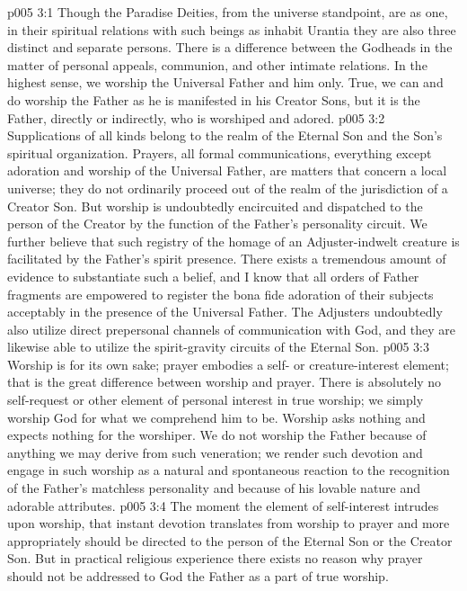 \vs p005 3:1 Though the Paradise Deities, from the universe standpoint, are as one, in their spiritual relations with such beings as inhabit Urantia they are also three distinct and separate persons. There is a difference between the Godheads in the matter of personal appeals, communion, and other intimate relations. In the highest sense, we worship the Universal Father and him only. True, we can and do worship the Father as he is manifested in his Creator Sons, but it is the Father, directly or indirectly, who is worshiped and adored.
\vs p005 3:2 Supplications of all kinds belong to the realm of the Eternal Son and the Son’s spiritual organization. Prayers, all formal communications, everything except adoration and worship of the Universal Father, are matters that concern a local universe; they do not ordinarily proceed out of the realm of the jurisdiction of a Creator Son. But worship is undoubtedly encircuited and dispatched to the person of the Creator by the function of the Father’s personality circuit. We further believe that such registry of the homage of an Adjuster\hyp{}indwelt creature is facilitated by the Father’s spirit presence. There exists a tremendous amount of evidence to substantiate such a belief, and I know that all orders of Father fragments are empowered to register the bona fide adoration of their subjects acceptably in the presence of the Universal Father. The Adjusters undoubtedly also utilize direct prepersonal channels of communication with God, and they are likewise able to utilize the spirit\hyp{}gravity circuits of the Eternal Son.
\vs p005 3:3 Worship is for its own sake; prayer embodies a self\hyp{} or creature\hyp{}interest element; that is the great difference between worship and prayer. There is absolutely no self\hyp{}request or other element of personal interest in true worship; we simply worship God for what we comprehend him to be. Worship asks nothing and expects nothing for the worshiper. We do not worship the Father because of anything we may derive from such veneration; we render such devotion and engage in such worship as a natural and spontaneous reaction to the recognition of the Father’s matchless personality and because of his lovable nature and adorable attributes.
\vs p005 3:4 The moment the element of self\hyp{}interest intrudes upon worship, that instant devotion translates from worship to prayer and more appropriately should be directed to the person of the Eternal Son or the Creator Son. But in practical religious experience there exists no reason why prayer should not be addressed to God the Father as a part of true worship.
